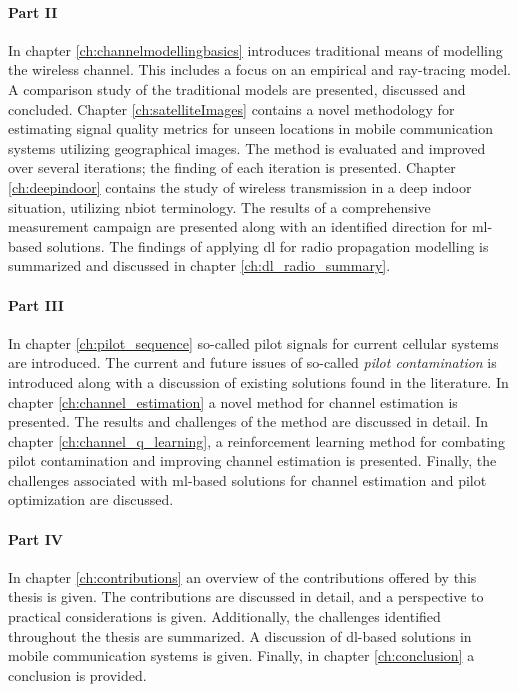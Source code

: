 \paragraph{Part II} In chapter \ref{ch:channelmodellingbasics} introduces traditional means of modelling the wireless channel. This includes a focus on an empirical and ray-tracing model. A comparison study of the traditional models are presented, discussed and concluded. Chapter \ref{ch:satelliteImages} contains a novel methodology for estimating signal quality metrics for unseen locations in mobile communication systems utilizing geographical images. The method is evaluated and improved over several iterations; the finding of each iteration is presented. Chapter \ref{ch:deepindoor} contains the study of wireless transmission in a deep indoor situation, utilizing \gls{nbiot} terminology. The results of a comprehensive measurement campaign are presented along with an identified direction for \gls{ml}-based solutions.  The findings of applying \gls{dl} for radio propagation modelling is summarized and discussed in chapter \ref{ch:dl_radio_summary}.

\paragraph{Part III} In chapter \ref{ch:pilot_sequence} so-called pilot signals for current cellular systems are introduced. The current and future issues of so-called \emph{pilot contamination} is introduced along with a discussion of existing solutions found in the literature. In chapter \ref{ch:channel_estimation} a novel method for channel estimation is presented. The results and challenges of the method are discussed in detail. In chapter \ref{ch:channel_q_learning}, a reinforcement learning method for combating pilot contamination and improving channel estimation is presented. Finally, the challenges associated with \gls{ml}-based solutions for channel estimation and pilot optimization are discussed. 

\paragraph{Part IV} In chapter \ref{ch:contributions} an overview of the contributions offered by this thesis is given. The contributions are discussed in detail, and a perspective to practical considerations is given. Additionally, the challenges identified throughout the thesis are summarized. A discussion of \gls{dl}-based solutions in mobile communication systems is given. Finally, in chapter \ref{ch:conclusion} a conclusion is provided.




